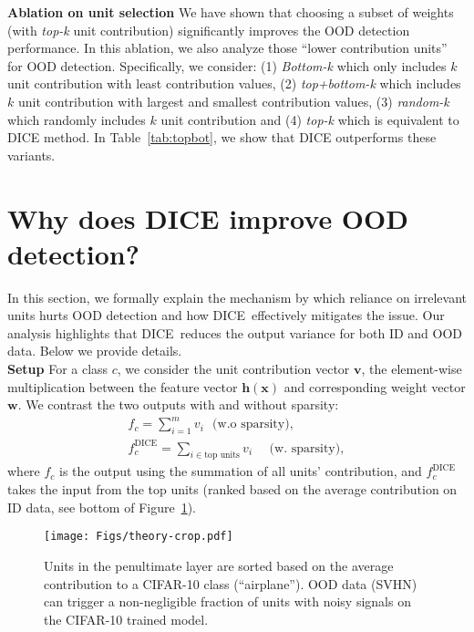\documentclass[runningheads]{llncs}
\newcommand{\methodAbbr}{DICE~}
\def\*#1{\mathbf{#1}}
\begin{document}
\noindent \textbf{Ablation on unit selection}
We have shown that choosing a subset of weights (with \emph{top-k} unit contribution) significantly improves the OOD detection performance. In this ablation, we also analyze those ``lower contribution units'' for OOD detection. Specifically, we consider: (1) \emph{Bottom-k} which only includes $k$ unit contribution with least contribution values, (2) \emph{top+bottom-k} which includes $k$ unit contribution with largest and smallest contribution values, (3) \emph{random-k} which randomly includes $k$ unit contribution and (4) \emph{top-k} which is equivalent to DICE method.  In Table~\ref{tab:topbot}, we show that DICE  outperforms these variants.





\section{Why does DICE improve OOD detection?}
\label{sec:theory}


In this section, we formally explain the mechanism by which reliance on irrelevant units hurts OOD detection and how \methodAbbr effectively mitigates the issue. Our analysis highlights that \methodAbbr reduces the output variance for both ID and OOD data. Below we provide details. \\

\noindent \textbf{Setup} For a class $c$, we consider the unit contribution vector $\*v$, the element-wise multiplication between the feature vector $\*h(\*x)$ and corresponding weight vector $\*w$. 
We contrast the two outputs with and without sparsity:
\begin{align*}
f_c= \sum_{i=1}^m v_i ~~~\text{(w.o sparsity)}  , \\
 f_c^\text{DICE}=\sum_{i\in \text{top units}} v_i ~~~ ~~~\text{(w. sparsity)},
\end{align*}
where $f_c$ is the output using the summation of all units' contribution, and $f_c^\text{DICE}$ takes the input from the top units (ranked based on the average contribution on ID data, see bottom of Figure~\ref{fig:theory}). \\


\begin{figure}
    \centering
    \texttt{[image: Figs/theory-crop.pdf]}
   \caption{\small Units in the penultimate layer are sorted based on the average contribution to a CIFAR-10 class (``airplane''). OOD data (SVHN) can trigger a non-negligible fraction of units with noisy signals on the CIFAR-10 trained model. }
  \label{fig:theory}
\end{figure}
\end{document}
